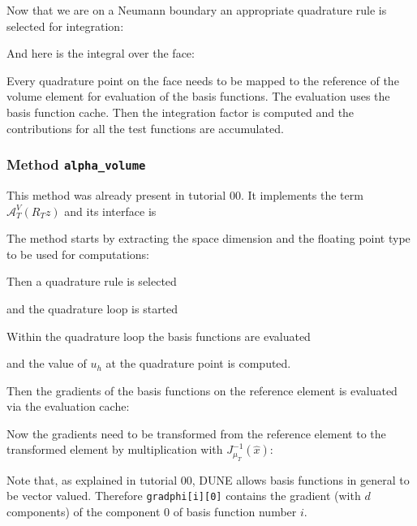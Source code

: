 \documentclass[a4paper,12pt]{article}
\begin{document}
Now that we are on a Neumann boundary an appropriate quadrature rule
is selected for integration:


And here is the integral over the face:

Every quadrature point on the face needs to be mapped to the reference
of the volume element for evaluation of the basis functions.
The evaluation uses the basis function cache. Then the integration
factor is computed and the contributions for all the test functions
are accumulated.

\subsubsection*{Method \lstinline{alpha_volume}}

This method was already present in tutorial 00. 
It implements the term $\mathcal{A}_T^V(R_T z)$ and its interface is


The method starts by extracting the space dimension and
the floating point type to be used for computations:


Then a quadrature rule is selected

and the quadrature loop is started


Within the quadrature loop the basis functions are evaluated

and the value of $u_h$ at the quadrature point is computed.

Then the gradients of the basis functions on the reference element is evaluated
via the evaluation cache:

Now the gradients need to be transformed from the reference element
to the transformed element by multiplication with $J_{\mu_T}^{-1}(\hat x)$:

Note that, as explained in tutorial 00, DUNE allows basis functions
in general to be vector valued. Therefore \lstinline{gradphi[i][0]} contains
the gradient (with $d$ components) of the component 0 of basis function number $i$.
\end{document}
